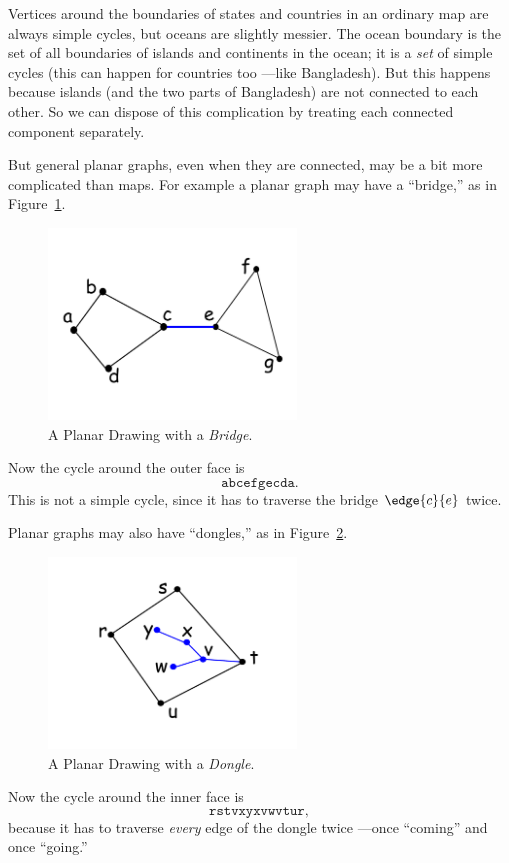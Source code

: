 Vertices around the boundaries of states and countries in an ordinary map
are always simple cycles, but oceans are slightly messier.  The ocean
boundary is the set of all boundaries of islands and continents in the
ocean; it is a \emph{set} of simple cycles (this can happen for countries
too ---like Bangladesh).  But this happens because islands (and the two
parts of Bangladesh) are not connected to each other.  So we can dispose
of this complication by treating each connected component separately.

But general planar graphs, even when they are connected, may be a bit more
complicated than maps.  For example a planar graph may have a
``bridge,'' as in Figure~\ref{fig:bridge}.
\begin{figure}[h]
\centering \includegraphics[height=2in]{figures/edge-twice-same-face}
\caption{A Planar Drawing with a \emph{Bridge}.}
\label{fig:bridge}
\end{figure}
Now the cycle around the outer face is
\[
\mathtt{abcefgecda}.
\]
This is not a simple cycle, since it has to traverse the bridge
$\edge{c}{e}$ twice.

Planar graphs may also have ``dongles,'' as in Figure~\ref{fig:dongle}.
\begin{figure}[h]
\centering \includegraphics[height=2in]{figures/dongle-face}
\caption{A Planar Drawing with a \emph{Dongle}.}
\label{fig:dongle}
\end{figure}
Now the cycle around the inner face is
\[
\mathtt{rstvxyxvwvtur},
\]
because it has to traverse \emph{every} edge of the dongle twice ---once
``coming'' and once ``going.''

